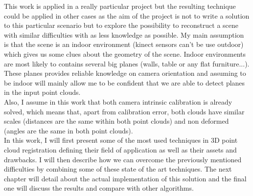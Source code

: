 This work is applied in a really particular project but the resulting technique could be applied in other cases as the aim of the project is not to write a solution to this particular scenario but to explore the possibility to reconstruct a scene with similar difficulties with as less knowledge as possible. My main assumption is that the scene is an indoor environment (kinect sensors can't be use outdoor) which gives us some clues about the geometry of the scene. Indoor environments are most likely to contains several big planes (walls, table or any flat furniture...). These planes provides reliable knowledge on camera orientation and assuming to be indoor will mainly allow me to be confident that we are able to detect planes in the input point clouds. \\
Also, I assume in this work that both camera intrinsic calibration is already solved, which means that, apart from calibration error, both clouds have similar scales (distances are the same within both point clouds) and non deformed (angles are the same in both point clouds). \\

In this work, I will first present some of the most used techniques in 3D point cloud registration defining their field of application as well as their assets and drawbacks. I will then describe how we can overcome the previously mentioned difficulties by combining some of these state of the art techniques. The next chapter will detail about the actual implementation of this solution and the final one will discuss the results and compare with other algorithms.
